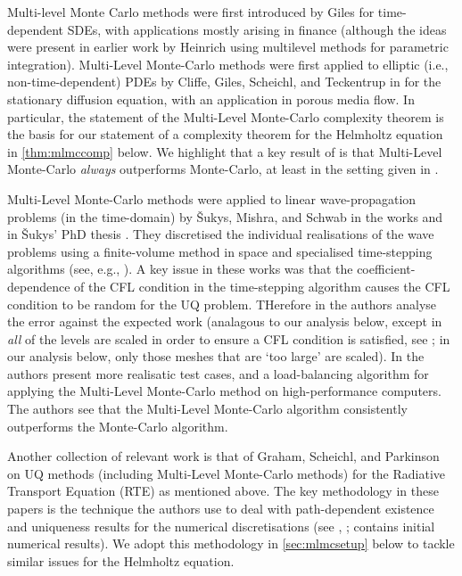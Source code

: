 Multi-level Monte Carlo methods were first introduced by Giles \cite{Gi:08} for time-dependent SDEs, with applications mostly arising in finance (although the ideas were present in earlier work by Heinrich \cite{He:98,He:01} using multilevel methods for parametric integration). Multi-Level Monte-Carlo methods were first applied to elliptic (i.e., non-time-dependent) PDEs by Cliffe, Giles, Scheichl, and Teckentrup in \cite{ClGiScTe:11} for the stationary diffusion equation, with an application in porous media flow. In particular, the statement of the Multi-Level Monte-Carlo complexity theorem \cite[Theorem 1]{ClGiScTe:11} is the basis for our statement of a complexity theorem for the Helmholtz equation in \cref{thm:mlmccomp} below. We highlight that a key result of \cite[Theorem 1]{ClGiScTe:11} is that Multi-Level Monte-Carlo \emph{always} outperforms Monte-Carlo, at least in the setting given in \cite{ClGiScTe:11}.

Multi-Level Monte-Carlo methods were applied to linear wave-propagation problems (in the time-domain) by \v{S}ukys, Mishra, and Schwab in the works \cite{SuMiSc:13,MiScSu:16} and in \v{S}ukys' PhD thesis \cite{Su:14}. They discretised the individual realisations of the wave problems using a finite-volume method in space and specialised time-stepping algorithms (see, e.g., \cite[Section 3.1]{MiScSu:16}). A key issue in these works was that the coefficient-dependence of the CFL condition in the time-stepping algorithm causes the CFL condition to be random for the UQ problem. THerefore in \cite{SuMiSc:13} the authors analyse the error against the expected work (analagous to our analysis below, except in \cite{SuMiSc:13} \emph{all} of the levels are scaled in order to ensure a CFL condition is satisfied, see \cite[Text following Theorem 5]{SuMiSc:13}; in our analysis below, only those meshes that are `too large' are scaled). In \cite{MiScSu:16} the authors present more realisatic test cases, and a load-balancing algorithm for applying the Multi-Level Monte-Carlo method on high-performance computers. The authors see that the Multi-Level Monte-Carlo algorithm consistently outperforms the Monte-Carlo algorithm.

Another collection of relevant work is that of Graham, Scheichl, and Parkinson \cite{GrPaSc:18,Pa:18,GrPaSc:19} on UQ methods (including Multi-Level Monte-Carlo methods) for the Radiative Transport Equation (RTE) as mentioned above. The key methodology in these papers is the technique the authors use to deal with path-dependent existence and uniqueness results for the numerical discretisations (see \cite[Chapter 4]{Pa:18}, \cite[Definition 5.5 ff.]{GrPaSc:19}; \cite{GrPaSc:18} contains initial numerical results). We adopt this methodology in \cref{sec:mlmcsetup} below to tackle similar issues for the Helmholtz equation.

